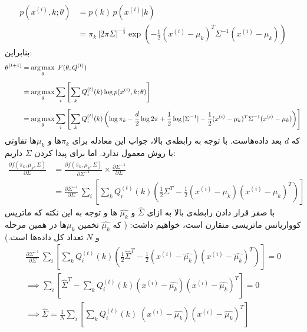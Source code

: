 \documentclass[a4paper, 12pt]{article}
\begin{document}
\begin{enumerate}
	\[
	\begin{aligned}
		p(x^{(i)}, k; \theta) &= p(k)\,p(x^{(i)}|k) \\
		&= \pi_k \,|2\pi\Sigma|^{-\frac{1}{2}} \exp\left(-\frac{1}{2}(x^{(i)}-\mu_k)^T\Sigma^{-1}(x^{(i)}-\mu_k)\right)
	\end{aligned}
	\]
	بنابراین:
	\[
	\begin{aligned}
		\theta^{(t+1)} &= \operatorname*{arg\,max}_\theta \; F(\theta, Q^{(t)}) \\[0.5em]
		&= \operatorname*{arg\,max}_\theta \sum_i\left[\sum_k Q_i^{(t)}(k) \log p(x^{(i)}, k; \theta) \right] \\[0.5em]
		&= \operatorname*{arg\,max}_\theta \sum_i\left[\sum_k Q_i^{(t)}(k) \left(\log \pi_k -\frac{d}{2} \log 2\pi + \frac{1}{2}\log|\Sigma^{-1}| -\frac{1}{2}(x^{(i)}-\mu_k)^T\Sigma^{-1}(x^{(i)}-\mu_k) \right) \right]
	\end{aligned}
	\]
	 که $d$ بعد داده‌هاست. با توجه به رابطه‌ی بالا، جواب این معادله برای $\pi_k$ها و $\mu_k$ها تفاوتی با روش معمول  ندارد. اما برای پیدا کردن $\Sigma$ داریم:
	\[
	\begin{aligned}
		\frac{\partial f(\pi_k, \mu_k, \Sigma)}{\partial \Sigma} &= \frac{\partial f(\pi_k, \mu_k, \Sigma)}{\partial \Sigma^{-1}} \times \frac{\partial \Sigma^{-1}}{\partial \Sigma} \\[0.5em]
		 &=\frac{\partial \Sigma^{-1}}{\partial \Sigma} \, \sum_i\left[\sum_k Q_i^{(t)}(k) \left(\frac{1}{2}\Sigma^T -\frac{1}{2} (x^{(i)}-\mu_k)(x^{(i)}-\mu_k)^T\right) \right]
	\end{aligned}
	\]
	با صفر قرار دادن رابطه‌ی بالا به ازای
	$\hat{\Sigma}$
	و
	$\hat{\mu_k}$
	ها و توجه به این نکته که ماتریس کوواریانس ماتریسی متقارن است، خواهیم داشت: (	که 
	$\hat{\mu_k}$
	تخمین $\mu_k$ها در همین مرحله و $N$ تعداد کل داده‌ها است.)
	\[
	\begin{gathered}
		\frac{\partial \Sigma^{-1}}{\partial \Sigma} \, \sum_i\left[\sum_k Q_i^{(t)}(k) \left(\frac{1}{2}\hat{\Sigma}^T -\frac{1}{2} (x^{(i)}-\hat{\mu_k})(x^{(i)}-\hat{\mu_k})^T\right) \right] = 0 \\[0.5em]
		\implies \sum_i\left[\hat{\Sigma}^T - \sum_k Q_i^{(t)}(k) (x^{(i)}-\hat{\mu_k})(x^{(i)}-\hat{\mu_k})^T \right] = 0 \\[0.5em]
		\implies \boxed{\hat{\Sigma} = \frac{1}{N} \sum_i\left[ \sum_k Q_i^{(t)}(k)\;(x^{(i)}-\hat{\mu_k})(x^{(i)}-\hat{\mu_k})^T\right]}
	\end{gathered}
	\]

\pagebreak
\end{enumerate}
\end{document}
